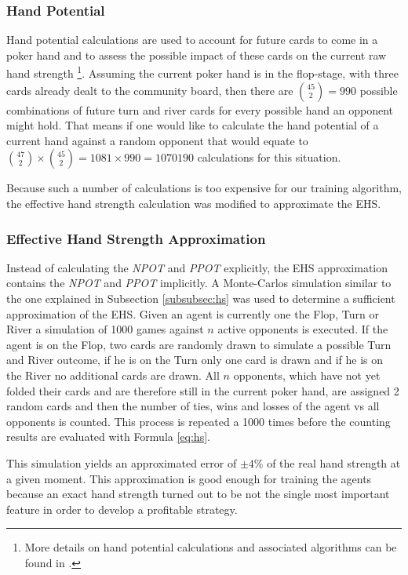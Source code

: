 \subsubsection{Hand Potential}
\label{subsubsec:hp}
Hand potential calculations are used to account for future cards to come in a poker hand and to assess the possible impact of these cards on the current raw hand strength \cite{challenge_of_poker}\footnote{More details on hand potential calculations and associated algorithms can be found in \cite[p. 216-218]{challenge_of_poker}.}.  
Assuming the current poker hand is in the flop-stage, with three cards already dealt to the community board, then there are ${45\choose 2} = 990$ possible combinations of future turn and river cards for every possible hand an opponent might hold. That means if one would like to calculate the hand potential of a current hand against a random opponent that would equate to ${47\choose 2} \times {45\choose 2} = 1081 \times 990 = 1070190$ calculations for this situation. \par
Because such a number of calculations is too expensive for our training algorithm, the effective hand strength calculation was modified to approximate the EHS.
\subsubsection{Effective Hand Strength Approximation}
Instead of calculating the \textit{NPOT} and \textit{PPOT} explicitly, the EHS approximation contains the \textit{NPOT} and \textit{PPOT} implicitly. A Monte-Carlos simulation similar to the one explained in Subsection \ref{subsubsec:hs} was used to determine a sufficient approximation of the EHS. Given an agent is currently one the Flop, Turn or River a simulation of 1000 games against $n$ active opponents is executed. If the agent is on the Flop, two cards are randomly drawn to simulate a possible Turn and River outcome, if he is on the Turn only one card is drawn and if he is on the River no additional cards are drawn. All $n$ opponents, which have not yet folded their cards and are therefore still in the current poker hand, are assigned 2 random cards and then the number of ties, wins and losses of the agent vs all opponents is counted. This process is repeated a 1000 times before the counting results are evaluated with Formula \ref{eq:hs}.\par
This simulation yields an approximated error of $\pm4\%$ of the real hand strength at a given moment. This approximation is good enough for training the agents because an exact hand strength turned out to be not the single most important feature in order to develop a profitable strategy.  
\pagebreak
